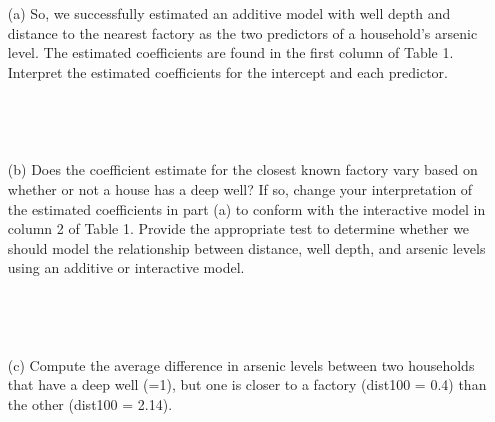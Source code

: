 \documentclass[12pt,letterpaper]{article}
\begin{document}
{\begin{enumerate}
			
			Predicted Fatness Index of Ewe group = -18.137 -8.362*0 -4.072*0
			Predicted Fatness Index of Ewe group = -18.137
			
			They are all negative values, so it does not make sense? If I ignore the negative values, then the Wether group has the highest Fatness index for every weight.
			
			DONE- ISH
			
			\begin{verbatim}
				
				
			\end{verbatim}
			\vspace{.5cm}
			\section*{Question 3: Arsenic}  
			\item [(a)] 
			So, we successfully estimated an additive model with well depth and distance to the
			nearest factory as the two predictors of a household’s arsenic level. The estimated
			coefficients are found in the first column of Table 1. Interpret the estimated coefficients
			for the intercept and each predictor.
			\begin{verbatim}
				
				
				
			\end{verbatim}
			\item [(b)] Does the coefficient estimate for the closest known factory vary based on whether or not
			a house has a deep well? If so, change your interpretation of the estimated coefficients
			in part (a) to conform with the interactive model in column 2 of Table 1. Provide
			the appropriate test to determine whether we should model the relationship between
			distance, well depth, and arsenic levels using an additive or interactive model.
			
			
			\begin{verbatim}
				
				
				
			\end{verbatim}
			\item [(c)] Compute the average difference in arsenic levels between two households that have a
			deep well (=1), but one is closer to a factory (dist100 = 0.4) than the other (dist100 =
			2.14).
			
			\begin{verbatim}
				
				
				

\end{verbatim}
\end{enumerate}}
\end{document}
